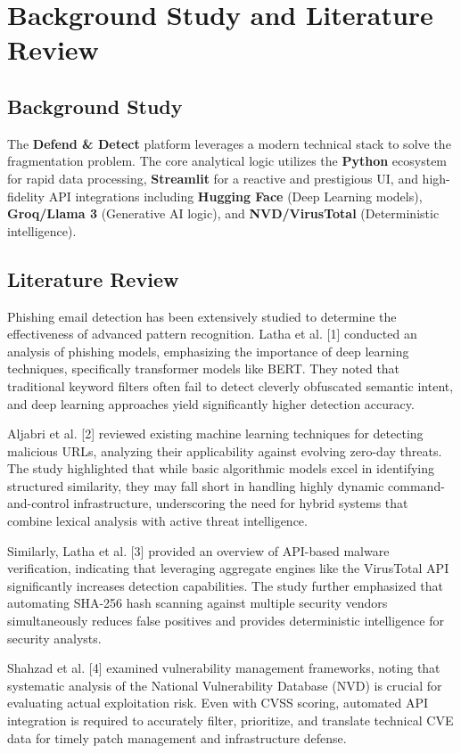 \documentclass[12pt,a4paper]{report}
\begin{document}
\chapter{Background Study and Literature Review}

\section{Background Study}
The \textbf{Defend \& Detect} platform leverages a modern technical stack to solve the fragmentation problem. The core analytical logic utilizes the \textbf{Python} ecosystem for rapid data processing, \textbf{Streamlit} for a reactive and prestigious UI, and high-fidelity API integrations including \textbf{Hugging Face} (Deep Learning models), \textbf{Groq/Llama 3} (Generative AI logic), and \textbf{NVD/VirusTotal} (Deterministic intelligence).

\section{Literature Review}
Phishing email detection has been extensively studied to determine the effectiveness of advanced pattern recognition. Latha et al. [1] conducted an analysis of phishing models, emphasizing the importance of deep learning techniques, specifically transformer models like BERT. They noted that traditional keyword filters often fail to detect cleverly obfuscated semantic intent, and deep learning approaches yield significantly higher detection accuracy.

Aljabri et al. [2] reviewed existing machine learning techniques for detecting malicious URLs, analyzing their applicability against evolving zero-day threats. The study highlighted that while basic algorithmic models excel in identifying structured similarity, they may fall short in handling highly dynamic command-and-control infrastructure, underscoring the need for hybrid systems that combine lexical analysis with active threat intelligence.

Similarly, Latha et al. [3] provided an overview of API-based malware verification, indicating that leveraging aggregate engines like the VirusTotal API significantly increases detection capabilities. The study further emphasized that automating SHA-256 hash scanning against multiple security vendors simultaneously reduces false positives and provides deterministic intelligence for security analysts.

Shahzad et al. [4] examined vulnerability management frameworks, noting that systematic analysis of the National Vulnerability Database (NVD) is crucial for evaluating actual exploitation risk. Even with CVSS scoring, automated API integration is required to accurately filter, prioritize, and translate technical CVE data for timely patch management and infrastructure defense.
\end{document}
